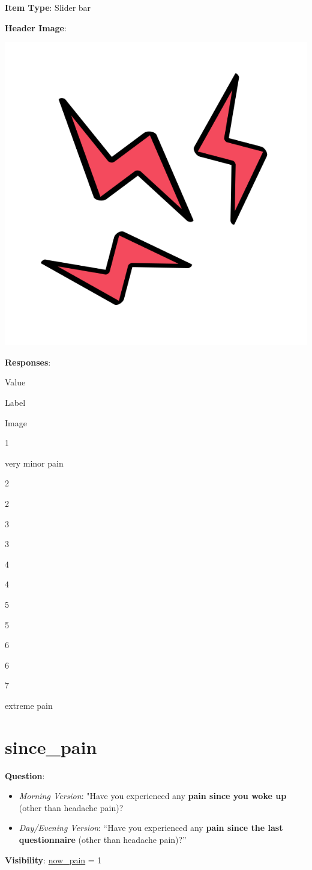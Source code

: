 \documentclass[]{book}
\providecommand{\tightlist}{%
  \setlength{\itemsep}{0pt}\setlength{\parskip}{0pt}}
\begin{document}
\textbf{Item Type}: Slider bar

\textbf{Header Image}:

\begin{flushleft}\includegraphics[width=0.33\linewidth]{downloadFigs4latex_NIMH_Applet_Codebook/now_pain_level_headerImg} \end{flushleft}

\textbf{Responses}:

Value

Label

Image

1

very minor pain

2

2

3

3

4

4

5

5

6

6

7

extreme pain

\hypertarget{since_pain}{%
\section{since\_pain}\label{since_pain}}

\textbf{Question}:

\begin{itemize}
\tightlist
\item
  \emph{Morning Version}: "Have you experienced any \textbf{pain since you woke up} (other than headache pain)?
\item
  \emph{Day/Evening Version}: ``Have you experienced any \textbf{pain since the last questionnaire} (other than headache pain)?''
\end{itemize}

\textbf{Visibility}: \protect\hyperlink{now_pain}{now\_pain} = 1
\end{document}
